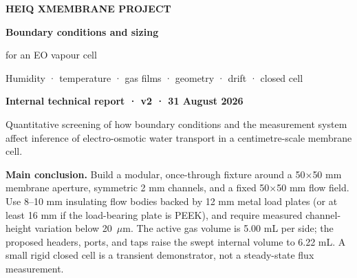 \documentclass[10pt,a4paper]{article}
\begin{document}
\thispagestyle{empty}
\vspace*{-10mm}
\begin{tcolorbox}[enhanced,colback=Navy,colframe=Navy,boxrule=0pt,
  arc=0mm,left=11mm,right=11mm,top=13mm,bottom=13mm,width=\textwidth]
  {\sffamily\bfseries\color{TealLight}\large HEIQ XMEMBRANE PROJECT}\par\vspace{7mm}
  {\raggedright\sffamily\bfseries\color{white}\fontsize{29}{33}\selectfont
  Boundary conditions and sizing\par for an EO vapour cell}\par\vspace{4mm}
  {\sffamily\color{white!85}\fontsize{14}{18}\selectfont
  Humidity · temperature · gas films · geometry · drift · closed cell}
\end{tcolorbox}

\vspace{13mm}
{\sffamily\bfseries\fontsize{16}{20}\selectfont\color{Navy}
Internal technical report · v2 · 31 August 2026}\par
\vspace{4mm}
{\fontsize{12}{17}\selectfont\color{Ink}
Quantitative screening of how boundary conditions and the measurement system
affect inference of electro-osmotic water transport in a centimetre-scale
membrane cell.}

\vspace{7mm}
\begin{mainbox}
\textbf{Main conclusion.} Build a modular, once-through fixture around a
50$\times$50 mm membrane aperture, symmetric 2 mm channels, and a fixed
50$\times$50 mm flow field. Use 8--10 mm insulating flow bodies backed by
12 mm metal load plates (or at least 16 mm if the load-bearing plate is PEEK),
and require measured channel-height variation below 20~$\mu$m. The active gas volume is 5.00 mL
per side; the proposed headers, ports, and taps raise the swept internal volume
to 6.22 mL. A small rigid closed cell is a transient demonstrator, not a
steady-state flux measurement.
\end{mainbox}
\end{document}
